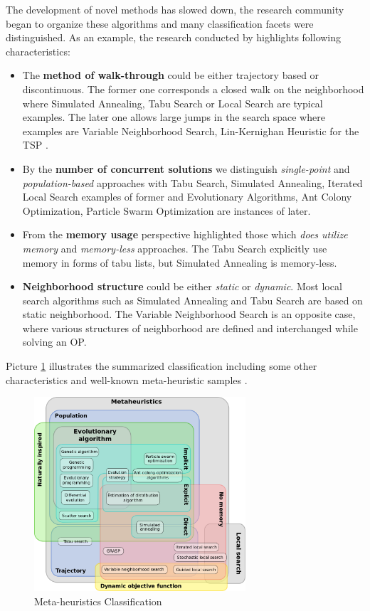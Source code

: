 The development of novel methods has slowed down, the research community began to organize these algorithms and many classification facets were distinguished. As an example, the research conducted by \cite{birattari2001classification} highlights following characteristics:
\begin{itemize}
	\item The \textbf{method of walk-through} could be either trajectory based or discontinuous. The former one corresponds a closed walk on the neighborhood where Simulated Annealing, Tabu Search or Local Search are typical examples. The later one allows large jumps in the search space where examples are Variable Neighborhood Search, Lin-Kernighan Heuristic for the TSP \cite{lin1973effective}.
	
	\item By the \textbf{number of concurrent solutions} we distinguish \textit{single-point} and \textit{population-based} approaches with Tabu Search, Simulated Annealing, Iterated Local Search examples of former and Evolutionary Algorithms, Ant Colony Optimization, Particle Swarm Optimization are instances of later.
	
	\item From the \textbf{memory usage} perspective highlighted those which \textit{does utilize memory} and \textit{memory-less} approaches. The Tabu Search explicitly use memory in forms of tabu lists, but Simulated Annealing is memory-less.
	
	\item \textbf{Neighborhood structure} could be either \textit{static} or \textit{dynamic}. Most local search algorithms such as Simulated Annealing and Tabu Search are based on static neighborhood. The Variable Neighborhood Search is an opposite case, where various structures of neighborhood are defined and interchanged while solving an OP. 
\end{itemize}

Picture \ref{BG: MH classification} illustrates the summarized classification including some other characteristics and well-known meta-heuristic samples \cite{wiki_MH_classification}.
\begin{figure}
	\centering
	\includegraphics[width=0.7\textwidth]{graphics/Background/Metaheuristics_classification}
	\caption{Meta-heuristics Classification}
	\label{BG: MH classification}
\end{figure}


